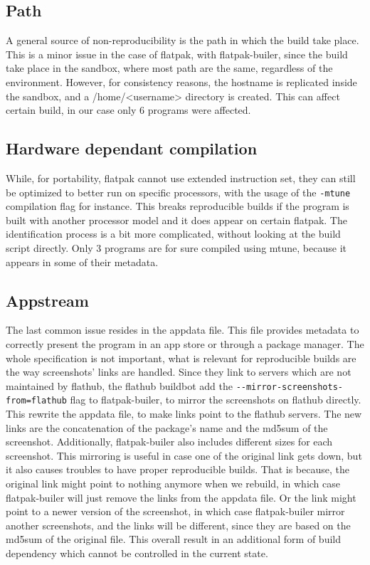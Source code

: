 \documentclass[a4paper,11pt,oneside]{report}
\theoremstyle{definition}
\newcommand{\rb}{reproducible builds\xspace}
\newcommand{\fp}{flatpak\xspace}
\newcommand{\fh}{flathub\xspace}
\newcommand{\fb}{flatpak-builer\xspace}
\newcommand{\fhbb}{flathub buildbot\xspace}
\begin{document}
\subsection*{Path}
A general source of non-reproducibility is the path in which the build take
place. This is a minor issue in the case of \fp, with \fb, since the build take
place in the sandbox, where most path are the same, regardless of the
environment. However, for consistency reasons, the hostname is replicated
inside the sandbox, and a /home/<username> directory is created. This can
affect certain build, in our case only 6 programs were affected.

\subsection*{Hardware dependant compilation}
While, for portability, \fp cannot use extended instruction set, they can still
be optimized to better run on specific processors, with the usage of the
\verb|-mtune| compilation flag for instance. This breaks \rb if the program is
built with another processor model and it does appear on certain \fp. The
identification process is a bit more complicated, without looking at the build
script directly. Only 3 programs are for sure compiled using mtune, because it
appears in some of their metadata.

\subsection*{Appstream}
The last common issue resides in the appdata file. This file provides metadata
to correctly present the program in an app store or through a package manager.
The whole specification is not important, what is relevant for \rb are the way
screenshots' links are handled. Since they link to servers which are not
maintained by \fh, the \fhbb add the \verb|--mirror-screenshots-from=flathub|
flag to \fb, to mirror the screenshots on \fh directly. This rewrite the
appdata file, to make links point to the \fh servers. The new links are the
concatenation of the package's name and the md5sum of the screenshot.
Additionally, \fb also includes different sizes for each screenshot. This
mirroring is useful in case one of the original link gets down, but it also
causes troubles to have proper \rb. That is because, the original link might
point to nothing anymore when we rebuild, in which case \fb will just remove
the links from the appdata file. Or the link might point to a newer version of
the screenshot, in which case \fb mirror another screenshots, and the links will
be different, since they are based on the md5sum of the original file. This
overall result in an additional form of build dependency which cannot be
controlled in the current state.
\end{document}
